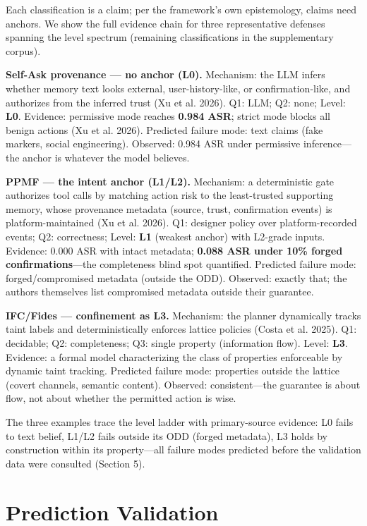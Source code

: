 \documentclass[11pt]{article}
\begin{document}
Each classification is a claim; per the framework's own epistemology, claims need anchors. We show the full evidence chain for three representative defenses spanning the level spectrum (remaining classifications in the supplementary corpus).

\textbf{Self-Ask provenance --- no anchor (L0).} Mechanism: the LLM infers whether memory text looks external, user-history-like, or confirmation-like, and authorizes from the inferred trust (Xu et al. 2026). Q1: LLM; Q2: none; Level: \textbf{L0}. Evidence: permissive mode reaches \textbf{0.984 ASR}; strict mode blocks all benign actions (Xu et al. 2026). Predicted failure mode: text claims (fake markers, social engineering). Observed: 0.984 ASR under permissive inference---the anchor is whatever the model believes.

\textbf{PPMF --- the intent anchor (L1/L2).} Mechanism: a deterministic gate authorizes tool calls by matching action risk to the least-trusted supporting memory, whose provenance metadata (source, trust, confirmation events) is platform-maintained (Xu et al. 2026). Q1: designer policy over platform-recorded events; Q2: correctness; Level: \textbf{L1} (weakest anchor) with L2-grade inputs. Evidence: 0.000 ASR with intact metadata; \textbf{0.088 ASR under 10\% forged confirmations}---the completeness blind spot quantified. Predicted failure mode: forged/compromised metadata (outside the ODD). Observed: exactly that; the authors themselves list compromised metadata outside their guarantee.

\textbf{IFC/Fides --- confinement as L3.} Mechanism: the planner dynamically tracks taint labels and deterministically enforces lattice policies ({Costa et al.} 2025). Q1: decidable; Q2: completeness; Q3: single property (information flow). Level: \textbf{L3}. Evidence: a formal model characterizing the class of properties enforceable by dynamic taint tracking. Predicted failure mode: properties outside the lattice (covert channels, semantic content). Observed: consistent---the guarantee is about flow, not about whether the permitted action is wise.

The three examples trace the level ladder with primary-source evidence: L0 fails to text belief, L1/L2 fails outside its ODD (forged metadata), L3 holds by construction within its property---all failure modes predicted before the validation data were consulted (Section 5).

\section{Prediction Validation}\label{prediction-validation}
\end{document}
